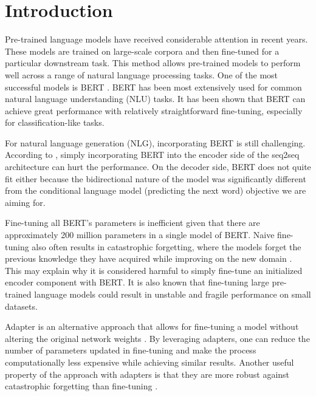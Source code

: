 \chapter*{Introduction}
Pre-trained language models  have received considerable attention in recent years. These models are trained on large-scale corpora and then fine-tuned for a particular downstream task. This method allows pre-trained models to perform well across a range of natural language processing tasks. One of the most successful models is BERT . BERT has been most extensively used for common natural language understanding (NLU) tasks. It has been shown that BERT can achieve great performance with relatively straightforward fine-tuning, especially for classification-like tasks.

For natural language generation (NLG), incorporating BERT is still challenging. According to , simply incorporating BERT into the encoder side of the seq2seq architecture can hurt the performance. On the decoder side, BERT does not quite fit either because the bidirectional nature of the model was significantly different from the conditional language model (predicting the next word) objective we are aiming for.

Fine-tuning all BERT's parameters is inefficient given that there are approximately 200 million parameters in a single model of BERT. Naive fine-tuning also often results in catastrophic forgetting, where the models forget the previous knowledge they have acquired while improving on the new domain . This may explain why it is considered harmful to simply fine-tune an initialized encoder component with BERT. It is also known that fine-tuning large pre-trained language models could result in unstable and fragile performance on small datasets.

Adapter is an alternative approach that allows for fine-tuning a model without altering the original network weights . By leveraging adapters, one can reduce the number of parameters updated in fine-tuning and make the process computationally less expensive while achieving similar results. Another useful property of the approach with adapters is that they are more robust against catastrophic forgetting than fine-tuning .

